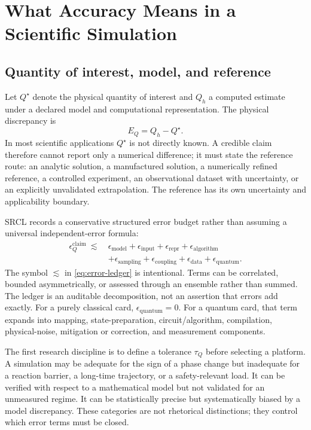 \documentclass[conference]{../../../../Conference-LaTeX-template_10-17-19/IEEEtran}
\begin{document}
\section{What Accuracy Means in a Scientific Simulation}
\subsection{Quantity of interest, model, and reference}
Let $Q^\star$ denote the physical quantity of interest and $Q_h$ a computed estimate under a declared model and computational representation. The physical discrepancy is
\begin{equation}
E_Q=Q_h-Q^\star.
\label{eq:physical-error}
\end{equation}
In most scientific applications $Q^\star$ is not directly known. A credible claim therefore cannot report only a numerical difference; it must state the reference route: an analytic solution, a manufactured solution, a numerically refined reference, a controlled experiment, an observational dataset with uncertainty, or an explicitly unvalidated extrapolation. The reference has its own uncertainty and applicability boundary.

SRCL records a conservative structured error budget rather than assuming a universal independent-error formula:
\begin{equation}
\begin{aligned}
\epsilon_Q^{\mathrm{claim}}\ \lesssim\ &\epsilon_{\mathrm{model}}+\epsilon_{\mathrm{input}}+\epsilon_{\mathrm{repr}}+\epsilon_{\mathrm{algorithm}}\\
&+\epsilon_{\mathrm{sampling}}+\epsilon_{\mathrm{coupling}}+\epsilon_{\mathrm{data}}+\epsilon_{\mathrm{quantum}}.
\end{aligned}
\label{eq:error-ledger}
\end{equation}
The symbol $\lesssim$ in \eqref{eq:error-ledger} is intentional. Terms can be correlated, bounded asymmetrically, or assessed through an ensemble rather than summed. The ledger is an auditable decomposition, not an assertion that errors add exactly. For a purely classical card, $\epsilon_{\mathrm{quantum}}=0$. For a quantum card, that term expands into mapping, state-preparation, circuit/algorithm, compilation, physical-noise, mitigation or correction, and measurement components.

The first research discipline is to define a tolerance $\tau_Q$ before selecting a platform. A simulation may be adequate for the sign of a phase change but inadequate for a reaction barrier, a long-time trajectory, or a safety-relevant load. It can be verified with respect to a mathematical model but not validated for an unmeasured regime. It can be statistically precise but systematically biased by a model discrepancy. These categories are not rhetorical distinctions; they control which error terms must be closed.
\end{document}
